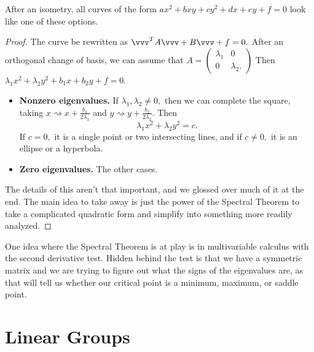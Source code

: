 \begin{theorem}
After an isometry, all curves of the form $ax^2 + bxy + cy^2 + dx + ey + f = 0$ look like one of these options. 
\end{theorem}
\begin{proof}
The curve be rewritten as $\vvv^TA\vvv + B\vvv + f = 0.$ After an orthogonal change of basis, we can assume that $A = \begin{pmatrix}
\lambda_1 & 0 \\ 0 & \lambda_2.
\end{pmatrix}$
Then $\lambda_1x^2 + \lambda_2y^2 + b_1x + b_2y + f = 0.$ 
\begin{itemize}
    \item \textbf{Nonzero eigenvalues.} If $\lambda_1, \lambda_2 \neq 0,$ then we can complete the square, taking $x \rightsquigarrow x + \frac{b_1}{2\lambda_1}$ and $y \rightsquigarrow y + \frac{b_2}{2\lambda_2}$. Then 
    \[
    \lambda_1x^2 + \lambda_2y^2 = c.
    \]
    If $c = 0,$ it is a single point or two intersecting lines, and if $c \neq 0,$ it is an ellipse or a hyperbola. 
    
    \item \textbf{Zero eigenvalues.} The other cases. 
\end{itemize}
The details of this aren't that important, and we glossed over much of it at the end. 
The main idea to take away is just the power of the Spectral Theorem to take a complicated quadratic form and simplify into something more readily analyzed. 
\end{proof}

One idea where the Spectral Theorem is at play is in multivariable calculus with the second derivative test.
Hidden behind the test is that we have a symmetric matrix and we are trying to figure out what the signs of the eigenvalues are, as that will tell us whether our critical point is a minimum, maximum, or saddle point.

\newpage


\section{Linear Groups}

